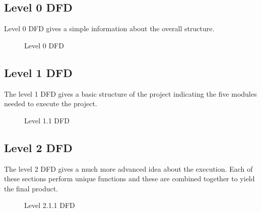 \documentclass[12pt,a4paper,oneside]{report}
\begin{document}
\pagebreak

\subsection{Level 0 DFD}
Level 0 DFD gives a simple information about the overall structure. 
\begin{figure}[h!]
\begin{center}

\hspace{1 in}
\caption{Level 0 DFD}
\end{center}
\end{figure}

\subsection{Level 1 DFD}
The level 1 DFD gives a basic structure of the project indicating the five modules needed to execute the project.
\begin{figure}[h]
\begin{center}
\hspace{1 in}
\caption{Level 1.1 DFD}
\end{center}
\vspace{-1.5 in}
\end{figure}


\pagebreak
\subsection{Level 2 DFD}
The level 2 DFD gives a much more advanced idea about the execution. Each of these sections perform unique functions and these are combined together to yield the final product.
\begin{figure}[h]
\begin{center}
\vspace{0.5 in}
\hspace{.0 in}
\caption{Level 2.1.1 DFD}
\end{center}

\end{figure}
\pagebreak
\end{document}
